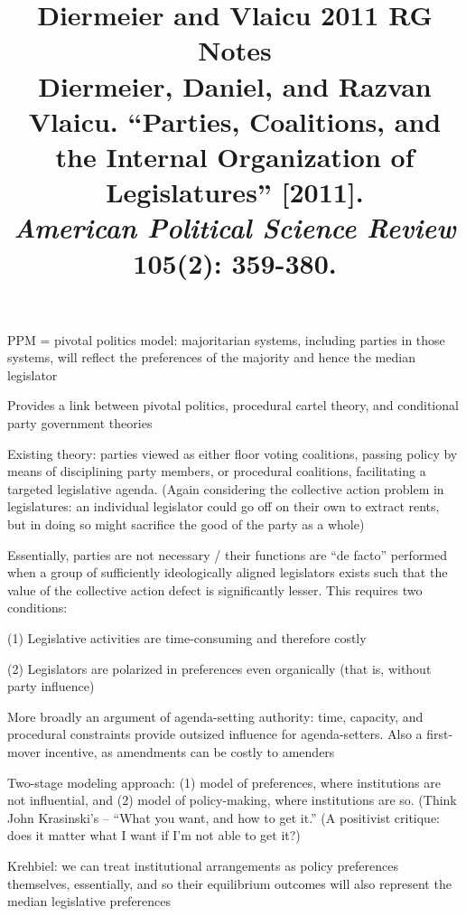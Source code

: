 \documentclass[12pt]{article}
\title{\textbf{Diermeier and Vlaicu 2011 RG Notes}\\
\large Diermeier, Daniel, and Razvan Vlaicu. ``Parties, Coalitions, and the Internal Organization of Legislatures'' [2011].\\
\textit{American Political Science Review} 105(2): 359-380.}
\author{}
\date{}
\begin{document}
\maketitle

PPM = pivotal politics model: majoritarian systems, including parties in those systems, will reflect the preferences of the majority and hence the median legislator

Provides a link between pivotal politics, procedural cartel theory, and conditional party government theories

Existing theory: parties viewed as either floor voting coalitions, passing policy by means of disciplining party members, or procedural coalitions, facilitating a targeted legislative agenda. (Again considering the collective action problem in legislatures: an individual legislator could go off on their own to extract rents, but in doing so might sacrifice the good of the party as a whole)

Essentially, parties are not necessary / their functions are ``de facto'' performed when a group of sufficiently ideologically aligned legislators exists such that the value of the collective action defect is significantly lesser. This requires two conditions:

(1) Legislative activities are time-consuming and therefore costly

(2) Legislators are polarized in preferences even organically (that is, without party influence)

More broadly an argument of agenda-setting authority: time, capacity, and procedural constraints provide outsized influence for agenda-setters. Also a first-mover incentive, as amendments can be costly to amenders

Two-stage modeling approach: (1) model of preferences, where institutions are not influential, and (2) model of policy-making, where institutions are so. (Think John Krasinski's -- ``What you want, and how to get it.'' (A positivist critique: does it matter what I want if I'm not able to get it?)

Krehbiel: we can treat institutional arrangements as policy preferences themselves, essentially, and so their equilibrium outcomes will also represent the median legislative preferences
\end{document}
